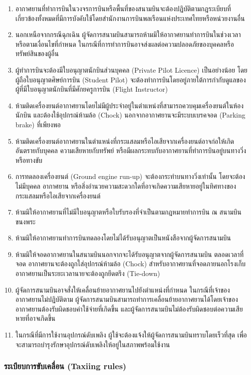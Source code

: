 \begin{enumerate}
\item อากาศยานที่ทำการบินในวงจรการบินหรือพื้นที่ของสนามบินจะต้องปฏิบัติตามกฎระเบียบที่เกี่ยวข้องทั้งหมดที่มีการบังคับใช้โดยสำนักงานการบินพลเรือนแห่งประเทศไทยหรือหน่วยงานอื่น
\item นอกเหนือจากกรณีฉุกเฉิน ผู้จัดการสนามบินสามารถห้ามมิให้อากาศยานทำการบินในช่วงเวลาหรือตามเงื่อนไขที่กำหนด ในกรณีที่การทำการบินอาจส่งผลต่อความปลอดภัยของบุคคลหรือทรัพย์สินของผู้อื่น
\item ผู้ทำการบินจะต้องมีใบอนุญาตนักบินส่วนบุคคล (Private Pilot Licence) เป็นอย่างน้อย โดยผู้ถือใบอนุญาตศิษย์การบิน (Student Pilot) จะต้องทำการบินโดยอยู่ภายใต้การกำกับดูแลของผู้ที่มีใบอนุญาตนักบินที่มีศักยครูการบิน (Flight Instructor)
\item ห้ามติดเครื่องยนต์อากาศยานโดยไม่มีผู้ประจำอยู่ในตำแหน่งที่สามารถควบคุมเครื่องยนต์ในห้องนักบิน และต้องใช้อุปกรณ์ห้ามล้อ (Chock) นอกจากอากาศยานจะมีระบบเบรคจอด (Parking brake) ที่เพียงพอ
\item ห้ามติดเครื่องยนต์อากาศยานในตำแหน่งที่กระแสลมหรือไอเสียจากเครื่องยนต์อาจก่อให้เกิดอันตรายกับบุคคล ความเสียหายกับทรัพย์ หรือมีผลกระทบกับอากาศยานที่ทำการบินอยู่บนทางวิ่งหรือทางขับ
\item การทดลองเครื่องยนต์ (Ground engine run-up) จะต้องกระทำบนทางวิ่งเท่านั้น โดยจะต้องไม่มีบุคคล อากาศยาน หรือสิ่งอำนวยความสะดวกใดที่อาจเกิดความเสียหายอยู่ในทิศทางของกระแสลมหรือไอเสียจากเครื่องยนต์
\item ห้ามมิให้อากาศยานที่ไม่มีใบอนุญาตหรือใบรับรองที่จำเป็นตามกฎหมายทำการบิน ณ สนามบินขนงพระ
\item ห้ามมิให้อากาศยานทำการบินทดลองโดยไม่ได้รับอนุญาตเป็นหนังสือจากผู้จัดการสนามบิน
\item ห้ามมิให้จอดอากาศยานในสนามบินนอกจากจะได้รับอนุญาตจากผู้จัดการสนามบิน ตลอดเวลาที่จอด อากาศยานจะต้องถูกใส่อุปกรณ์ห้ามล้อ (Chock) สำหรับอากาศยานที่จอดภายนอกโรงเก็บอากาศยานเป็นระยะเวลานายจะต้องถูกยึดตรึง (Tie-down)
\item ผู้จัดการสนามบินอาจสั่งให้เคลื่อนย้ายอากาศยานไปยังตำแหน่งที่กำหนด ในกรณีที่เจ้าของอากาศยานไม่ปฏิบัติตาม ผู้จัดการสนามบินสามารถทำการเคลื่อนย้ายอากาศยานได้โดยเจ้าของอากาศยานต้องรับผิดชอบค่าใช้จ่ายที่เกิดขึ้น และผู้จัดการสนามบินไม่ต้องรับผิดชอบต่อความเสียหายที่อาจเกิดขึ้น
\item ในกรณีที่มีการใช้งานอุปกรณ์ดับเพลิง ผู้ใช้จะต้องแจ้งให้ผู้จัดการสนามบินทราบโดยเร็วที่สุด เพื่อจะสามารถบำรุงรักษาอุปกรณ์ดับเพลิงให้อยู่ในสภาพพร้อมใช้งาน
\end{enumerate}

\subsubsection{ระเบียบการขับเคลื่อน (Taxiing rules)}

